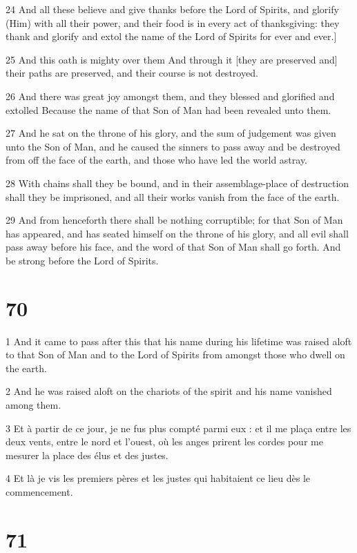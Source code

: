 \par 24 And all these believe and give thanks before the Lord of Spirits, and glorify (Him) with all their power, and their food is in every act of thanksgiving: they thank and glorify and extol the name of the Lord of Spirits for ever and ever.]
\par 25 And this oath is mighty over them And through it [they are preserved and] their paths are preserved, and their course is not destroyed.
\par 26 And there was great joy amongst them, and they blessed and glorified and extolled Because the name of that Son of Man had been revealed unto them.
\par 27 And he sat on the throne of his glory, and the sum of judgement was given unto the Son of Man, and he caused the sinners to pass away and be destroyed from off the face of the earth, and those who have led the world astray.
\par 28 With chains shall they be bound, and in their assemblage-place of destruction shall they be imprisoned, and all their works vanish from the face of the earth.
\par 29 And from henceforth there shall be nothing corruptible; for that Son of Man has appeared, and has seated himself on the throne of his glory, and all evil shall pass away before his face, and the word of that Son of Man shall go forth. And be strong before the Lord of Spirits.

\chapter{70}

\par 1 And it came to pass after this that his name during his lifetime was raised aloft to that Son of Man and to the Lord of Spirits from amongst those who dwell on the earth.
\par 2 And he was raised aloft on the chariots of the spirit and his name vanished among them.
\par 3 Et à partir de ce jour, je ne fus plus compté parmi eux : et il me plaça entre les deux vents, entre le nord et l'ouest, où les anges prirent les cordes pour me mesurer la place des élus et des justes.
\par 4 Et là je vis les premiers pères et les justes qui habitaient ce lieu dès le commencement.

\chapter{71}

